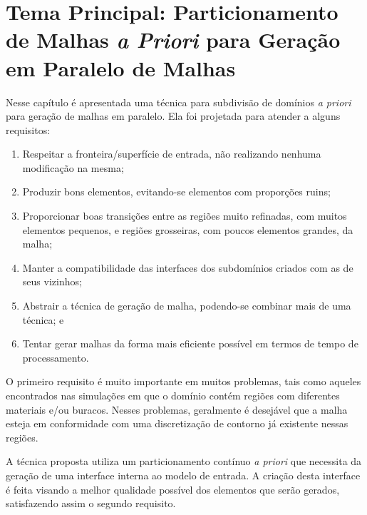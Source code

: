 \chapter{Tema Principal: Particionamento de Malhas \textit{a Priori} para Geração em Paralelo de Malhas}\label{tema1}

Nesse capítulo é apresentada uma técnica para subdivisão de domínios \textit{a priori} para geração de malhas em paralelo. Ela foi projetada para atender a alguns requisitos:

\begin{enumerate}
	\item Respeitar a fronteira/superfície de entrada, não realizando nenhuma modificação na mesma;
	
	\item Produzir bons elementos, evitando-se elementos com proporções ruins;
	
	\item Proporcionar boas transições entre as regiões muito refinadas, com muitos elementos pequenos, e regiões grosseiras, com poucos elementos grandes, da malha;
	
	\item Manter a compatibilidade das interfaces dos subdomínios criados com as de seus vizinhos;
	
	\item Abstrair a técnica de geração de malha, podendo-se combinar mais de uma técnica; e
	
	
	\item Tentar gerar malhas da forma mais eficiente possível em termos de tempo de processamento.
\end{enumerate}


O primeiro requisito é muito importante em muitos problemas, tais como aqueles encontrados nas simulações em que o domínio contém regiões com diferentes materiais e/ou buracos. Nesses problemas, geralmente é desejável que a malha esteja em conformidade com uma discretização de contorno já existente nessas regiões.

A técnica proposta utiliza um particionamento contínuo \textit{a priori} que necessita da geração de uma interface interna ao modelo de entrada. A criação desta interface é feita visando a melhor qualidade possível dos elementos que serão gerados, satisfazendo assim o segundo requisito.

